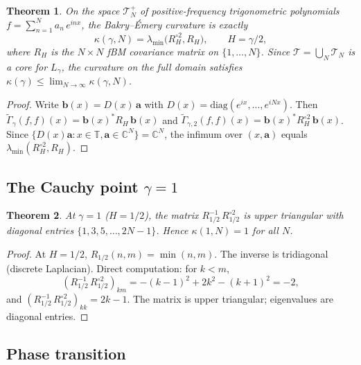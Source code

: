 \documentclass[11pt,a4paper]{article}
\theoremstyle{plain}
\newtheorem{theorem}{Theorem}[section]
\theoremstyle{definition}
\theoremstyle{remark}
\newcommand{\C}{\mathbb{C}}
\newcommand{\T}{\mathbb{T}}
\begin{document}
\begin{theorem}\label{thm:curvature}
On the space $\mathcal{T}_N^+$ of positive-frequency trigonometric
polynomials $f = \sum_{n=1}^N a_n\,e^{inx}$, the Bakry--\'Emery
curvature is exactly
\begin{equation}\label{eq:kappa-def}
  \kappa(\gamma,N) = \lambda_{\min}\!\bigl(R_H^{\circ 2}, R_H\bigr),
  \qquad H = \gamma/2,
\end{equation}
where $R_H$ is the $N \times N$ fBM covariance matrix on $\{1,\ldots,N\}$.
Since $\mathcal{T} = \bigcup_N \mathcal{T}_N$ is a core for $L_\gamma$,
the curvature on the full domain satisfies
$\kappa(\gamma) \leq \lim_{N\to\infty} \kappa(\gamma,N)$.
\end{theorem}

\begin{proof}
Write $\mathbf{b}(x) = D(x)\,\mathbf{a}$ with
$D(x) = \mathrm{diag}(e^{ix},\ldots,e^{iNx})$. Then
$\widetilde{\Gamma}_\gamma(f,f)(x) = \mathbf{b}(x)^* R_H\,\mathbf{b}(x)$
and $\widetilde{\Gamma}_{\gamma,2}(f,f)(x) =
\mathbf{b}(x)^* R_H^{\circ 2}\,\mathbf{b}(x)$.
Since $\{D(x)\mathbf{a} : x \in \T, \mathbf{a} \in \C^N\} = \C^N$,
the infimum over $(x,\mathbf{a})$ equals
$\lambda_{\min}(R_H^{\circ 2}, R_H)$.
\end{proof}


\subsection{The Cauchy point $\gamma = 1$}\label{sec:cauchy}

\begin{theorem}\label{thm:cauchy}
At $\gamma = 1$ ($H = 1/2$), the matrix $R_{1/2}^{-1}\,R_{1/2}^{\circ 2}$
is upper triangular with diagonal entries $\{1, 3, 5, \ldots, 2N-1\}$.
Hence $\kappa(1,N) = 1$ for all $N$.
\end{theorem}

\begin{proof}
At $H=1/2$, $R_{1/2}(n,m) = \min(n,m)$. The inverse is tridiagonal
(discrete Laplacian). Direct computation: for $k < m$,
\[
  (R_{1/2}^{-1}\,R_{1/2}^{\circ 2})_{km}
  = -(k-1)^2 + 2k^2 - (k+1)^2 = -2,
\]
and $(R_{1/2}^{-1}\,R_{1/2}^{\circ 2})_{kk} = 2k-1$.
The matrix is upper triangular; eigenvalues are diagonal entries.
\end{proof}


\subsection{Phase transition}
\end{document}
